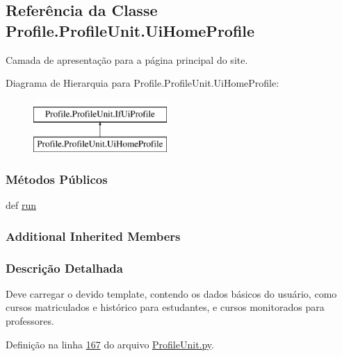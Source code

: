 \hypertarget{classProfile_1_1ProfileUnit_1_1UiHomeProfile}{\subsection{Referência da Classe Profile.\-Profile\-Unit.\-Ui\-Home\-Profile}
\label{classProfile_1_1ProfileUnit_1_1UiHomeProfile}
}


Camada de apresentação para a página principal do site.  


Diagrama de Hierarquia para Profile.\-Profile\-Unit.\-Ui\-Home\-Profile\-:\begin{figure}[H]
\begin{center}
\leavevmode
\includegraphics[height=2.000000cm]{db/dcf/classProfile_1_1ProfileUnit_1_1UiHomeProfile}
\end{center}
\end{figure}
\subsubsection*{Métodos Públicos}
\begin{DoxyCompactItemize}
\item 
def \hyperlink{classProfile_1_1ProfileUnit_1_1UiHomeProfile_a5abc7f7c1ca1cb3e070c36a869263e6d}{run}
\end{DoxyCompactItemize}
\subsubsection*{Additional Inherited Members}


\subsubsection{Descrição Detalhada}
Deve carregar o devido template, contendo os dados básicos do usuário, como cursos matriculados e histórico para estudantes, e cursos monitorados para professores. 

Definição na linha \hyperlink{ProfileUnit_8py_source_l00167}{167} do arquivo \hyperlink{ProfileUnit_8py_source}{Profile\-Unit.\-py}.



